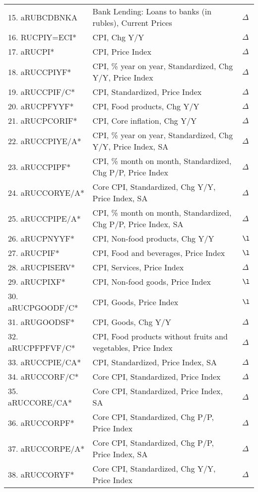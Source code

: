 \documentclass[a4paper, 14pt]{article}
\begin{document}
\begin{center}
\begin{longtable}{p{5.5cm} p{10cm} p{0.15cm}}
	15. aRUBCDBNKA &  Bank Lending: Loans to banks (in rubles), Current Prices & $\Delta$\\
	16. RUCPIY=ECI* &  CPI, Chg Y/Y & $\Delta$\\
	17. aRUCPI* &  CPI, Price Index & $\Delta$\\
	18. aRUCCPIYF* &  CPI, \% year on year, Standardized, Chg Y/Y, Price Index & $\Delta$\\
	19. aRUCCPIF/C* &  CPI, Standardized, Price Index & $\Delta$\\
	20. aRUCPFYYF* &  CPI, Food products, Chg Y/Y & $\Delta$\\
	21. aRUCPCORIF* &  CPI, Core inflation, Chg Y/Y & $\Delta$\\
	22. aRUCCPIYE/A* &  CPI, \% year on year, Standardized, Chg Y/Y, Price Index, SA & $\Delta$\\
	23. aRUCCPIPF* &  CPI, \% month on month, Standardized, Chg P/P, Price Index & $\Delta$\\
	24. aRUCCORYE/A* &  Core CPI, Standardized, Chg Y/Y, Price Index, SA & $\Delta$\\
	25. aRUCCPIPE/A* &  CPI, \% month on month, Standardized, Chg P/P, Price Index, SA & $\Delta$\\
	26. aRUCPNYYF* &  CPI, Non-food products, Chg Y/Y & $\l$\\
	27. aRUCPIF* &  CPI, Food and beverages, Price Index & $\l$\\
	28. aRUCPISERV* &  CPI, Services, Price Index & $\Delta$\\
	29. aRUCPIXF* &  CPI, Non-food goods, Price Index & $\l$\\
	30. aRUCPGOODF/C* &  CPI, Goods, Price Index & $\l$\\
	31. aRUGOODSF* &  CPI, Goods, Chg Y/Y & $\Delta$\\
	32. aRUCPFPFVF/C* &  CPI, Food products without fruits and vegetables, Price Index & $\Delta$\\
	33. aRUCCPIE/CA* &  CPI, Standardized, Price Index, SA & $\Delta$\\
	34. aRUCCORF/C* &  Core CPI, Standardized, Price Index & $\Delta$\\
	35. aRUCCORE/CA* &  Core CPI, Standardized, Price Index, SA & $\Delta$\\
	36. aRUCCORPF* &  Core CPI, Standardized, Chg P/P, Price Index & $\Delta$\\
	37. aRUCCORPE/A* &  Core CPI, Standardized, Chg P/P, Price Index, SA & $\Delta$\\
	38. aRUCCORYF* &  Core CPI, Standardized, Chg Y/Y, Price Index & $\Delta$\\

\end{longtable}
\end{center}
\end{document}
